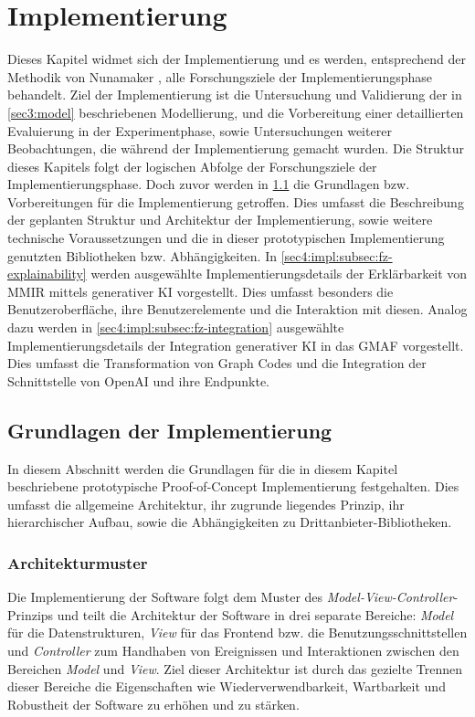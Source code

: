 \section{Implementierung}
\label{sec4:impl}
Dieses Kapitel widmet sich der Implementierung und es werden, entsprechend der Methodik von Nunamaker \cite{nunamaker}, alle Forschungsziele der Implementierungsphase behandelt.
Ziel der Implementierung ist die Untersuchung und Validierung der in \cref{sec3:model} beschriebenen Modellierung, und die Vorbereitung einer detaillierten Evaluierung in der Experimentphase, sowie Untersuchungen weiterer Beobachtungen, die während der Implementierung gemacht wurden.
Die Struktur dieses Kapitels folgt der logischen Abfolge der Forschungsziele der Implementierungsphase.
Doch zuvor werden in \cref{sec4:impl:subsec:basics} die Grundlagen bzw. Vorbereitungen für die Implementierung getroffen.
Dies umfasst die Beschreibung der geplanten Struktur und Architektur der Implementierung, sowie weitere technische Voraussetzungen und die in dieser prototypischen Implementierung genutzten Bibliotheken bzw. Abhängigkeiten.
In \cref{sec4:impl:subsec:fz-explainability} werden ausgewählte Implementierungsdetails der Erklärbarkeit von MMIR mittels generativer KI vorgestellt.
Dies umfasst besonders die Benutzeroberfläche, ihre Benutzerelemente und die Interaktion mit diesen.
Analog dazu werden in \cref{sec4:impl:subsec:fz-integration} ausgewählte Implementierungsdetails der Integration generativer KI in das GMAF vorgestellt.
Dies umfasst die Transformation von Graph Codes und die Integration der Schnittstelle von OpenAI und ihre Endpunkte.



\subsection{Grundlagen der Implementierung}
\label{sec4:impl:subsec:basics}
In diesem Abschnitt werden die Grundlagen für die in diesem Kapitel beschriebene prototypische Proof-of-Concept Implementierung festgehalten.
Dies umfasst die allgemeine Architektur, ihr zugrunde liegendes Prinzip, ihr hierarchischer Aufbau, sowie die Abhängigkeiten zu Drittanbieter-Bibliotheken.

\subsubsection{Architekturmuster}
Die Implementierung der Software folgt dem Muster des \textit{Model-View-Controller}-Prinzips und teilt die Architektur der Software in drei separate Bereiche: \textit{Model} für die Datenstrukturen, \textit{View} für das Frontend bzw. die Benutzungsschnittstellen und \textit{Controller} zum Handhaben von Ereignissen und Interaktionen zwischen den Bereichen \textit{Model} und \textit{View}.
Ziel dieser Architektur ist durch das gezielte Trennen dieser Bereiche die Eigenschaften wie Wiederverwendbarkeit, Wartbarkeit und Robustheit der Software zu erhöhen und zu stärken.

